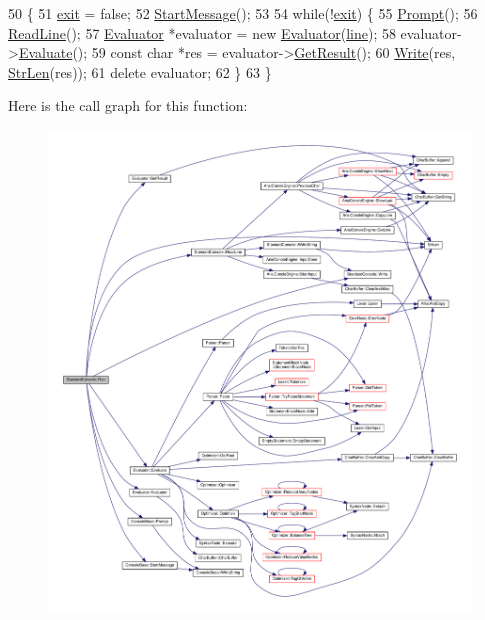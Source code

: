 \begin{DoxyCode}
50 \{
51     \hyperlink{classStandardConsole_a67538cb9ac4d002b2341386fab0b1f13}{exit} = \textcolor{keyword}{false};
52     \hyperlink{classConsoleBase_a1a390339da026c37c036f87f3a084e87}{StartMessage}();
53 
54     \textcolor{keywordflow}{while}(!\hyperlink{classStandardConsole_a67538cb9ac4d002b2341386fab0b1f13}{exit}) \{
55         \hyperlink{classConsoleBase_a79c5aa072ff3db35944a9825dcbfd9a7}{Prompt}();
56         \hyperlink{classStandardConsole_a387d8a0bf9d6ec722868026f58393942}{ReadLine}();
57         \hyperlink{classEvaluator}{Evaluator} *evaluator = \textcolor{keyword}{new} \hyperlink{classEvaluator}{Evaluator}(\hyperlink{classStandardConsole_a2ed234e29cf0056dfdc40bac5f7dd438}{line});
58         evaluator->\hyperlink{classEvaluator_a40b30ece9d43c658877ee7f52aaec0a8}{Evaluate}();
59         \textcolor{keyword}{const} \textcolor{keywordtype}{char} *res = evaluator->\hyperlink{classEvaluator_abcc678772175bf00127a3b307463ae4b}{GetResult}();
60         \hyperlink{classStandardConsole_a43844eb181d640c0e4860ef21c2e8fa7}{Write}(res, \hyperlink{clib_8h_a67ec56eb98b49515d35005a5b3bf9a32}{StrLen}(res));
61         \textcolor{keyword}{delete} evaluator;
62     \}
63 \}
\end{DoxyCode}


Here is the call graph for this function\+:\nopagebreak
\begin{figure}[H]
\begin{center}
\leavevmode
\includegraphics[width=350pt]{classStandardConsole_a9380023bba612b816b134589130bb254_cgraph}
\end{center}
\end{figure}


